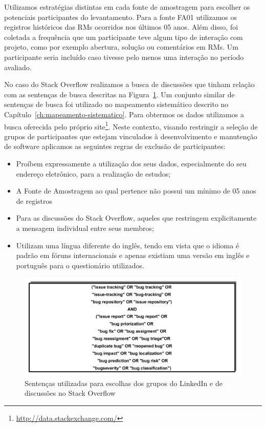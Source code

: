 Utilizamos estratégias distintas em cada fonte de amostragem para escolher os
potenciais participantes do levantamento. Para a fonte FA01 utilizamos os
registros históricos das RMs ocorridos nos últimos 05 anos. Além disso, foi
coletada a frequência que um participante teve algum tipo de interação com
projeto, como por exemplo abertura, solução ou comentários em RMs. Um
participante seria incluído caso tivesse pelo menos uma interação no período
avaliado.

No caso do Stack Overflow realizamos a busca de discussões que tinham relação
com as sentenças de busca descritas na Figura~\ref{fig:setencas-grupos}. Um
conjunto similar de sentenças de busca foi utilizado no mapeamento sistemático
descrito no Capítulo~\ref{ch:mapeamento-sistematico}. Para obtermos os dados
utilizamos a busca oferecida pelo próprio
site\footnote{\url{http://data.stackexchange.com/}}. Neste contexto, visando
restringir a seleção de grupos de participantes que estejam vinculados à
desenvolvimento e manutenção de software aplicamos as seguintes regras de
exclusão de participantes:

\begin{itemize}
	\item Proíbem expressamente a utilização dos seus dados, especialmente do
		seu endereço eletrônico, para a realização de estudos;
	\item A Fonte de Amostragem ao qual pertence não possui um mínimo de 05 anos
		de registros
	\item Para as discussões do Stack Overflow, aqueles que restringem
		explicitamente a mensagem individual entre seus membros;
    \item Utilizam uma língua diferente do inglês, tendo em vista que o idioma
		 é padrão em fóruns internacionais e apenas existiam uma versão em
		inglês e português para o questionário utilizados.
\end{itemize}

\begin{figure}[htpb]
	\centering
	\includegraphics[width=0.8\linewidth]{./chapter-pesquisa-com-profissionais/img/setencas-grupos.pdf}
	\caption{Sentenças utilizadas para escolhas dos grupos do LinkedIn e de
		discussões no Stack Overflow}
\label{fig:setencas-grupos}
\end{figure}

